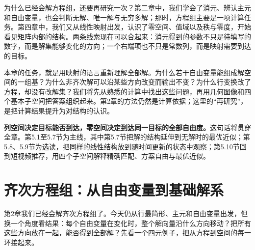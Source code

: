 \documentclass[a4paper,12pt,twoside,openany,fontset=none]{ctexbook}
\numberwithin{equation}{chapter}
\begin{document}
为什么已经会解方程组，还要再研究一次？第二章中，我们学会了消元、辨认主元和自由变量，也会判断无解、唯一解与无穷多解；那时，方程组主要是一项计算任务。第四章中，我们又从线性映射出发，认识了零空间、值域以及秩与零度，开始看见矩阵内部的结构。两条线索现在可以合起来：消元得到的参数不只是待填写的数字，而是解集能够变化的方向；一个右端项也不只是常数列，而是映射需要到达的目标。

本章的任务，就是用映射的语言重新理解全部解。为什么若干自由变量能组成解空间的一组基？为什么非齐次解可以沿某些方向改变而输出不变？为什么行变换改了方程，却没有改解集？我们将先从熟悉的计算中找出这些问题，再用几何图像和四个基本子空间把答案组织起来。第2章的方法仍然是计算依据；这里的“再研究”，是把计算结果提升为对结构的认识。

\textbf{列空间决定目标能否到达，零空间决定到达同一目标的全部自由度。}这句话将贯穿全章。第5.1至5.7节为主线，其中第5.7节把解的结构延伸到无解时的最优近似；第5.8、5.9节为选读，把同样的线性结构放到随时间更新的状态中观察；第5.10节回到短视频推荐，用四个子空间解释精确匹配、方案自由与最优近似。

\section{齐次方程组：从自由变量到基础解系}
\label{sec:five-homogeneous}

第2章我们已经会解齐次方程组了。今天仍从行最简形、主元和自由变量出发，但换一个角度看结果：每个自由变量在变化时，整个解向量沿什么方向移动？把所有这些方向放在一起，能否得到全部解？先看一个四元例子，把从方程到空间的每一环接起来。
\end{document}
